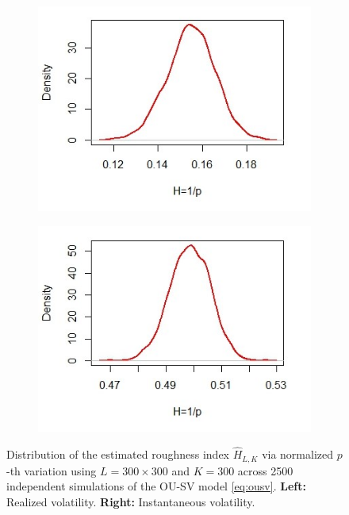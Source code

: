\documentclass{article}
\begin{document}
\begin{figure}[htbp]
    \centering
    
    \begin{subfigure}{0.48\textwidth}
        \includegraphics[width=\linewidth]{ex6_densRV.jpeg}
    \end{subfigure}
    \hfill
    \begin{subfigure}{0.48\textwidth}
        \includegraphics[width=\linewidth]{ex6_densIV.jpeg}
    \end{subfigure}
    
    \caption{Distribution of the estimated roughness index $\widehat{H}_{L,K}$ via normalized $p$-th variation using $L=300\times 300$ and $K=300$ across 2500 independent simulations of the OU-SV model \eqref{eq:ousv}. \textbf{Left:} Realized volatility. \textbf{Right:} Instantaneous volatility.}
    \label{fig:ex6dens}
\end{figure}
\end{document}
